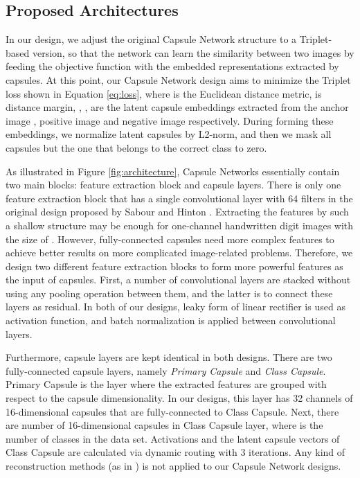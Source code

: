 \documentclass[10pt,twocolumn,letterpaper]{article}
\begin{document}
\subsection{Proposed Architectures}

In our design, we adjust the original Capsule Network structure to a Triplet-based version, so that the network can learn the similarity between two images by feeding the objective function with the embedded representations extracted by capsules. At this point, our Capsule Network design aims to minimize the Triplet loss shown in Equation \ref{eq:loss}, where  is the Euclidean distance metric,  is distance margin, , ,  are the latent capsule embeddings extracted from the anchor image , positive image  and negative image  respectively. During forming these embeddings, we normalize latent capsules by L2-norm, and then we mask all capsules but the one that belongs to the correct class to zero.



As illustrated in Figure \ref{fig:architecture}, Capsule Networks essentially contain two main blocks: feature extraction block and capsule layers. There is only one feature extraction block that has a single convolutional layer with 64 filters in the original design proposed by Sabour and Hinton \etal \cite{capsule}. Extracting the features by such a shallow structure may be enough for one-channel handwritten digit images with the size of  \cite{capsule}. However, fully-connected capsules need more complex features to achieve better results on more complicated image-related problems. Therefore, we design two different feature extraction blocks to form more powerful features as the input of capsules. First, a number of convolutional layers are stacked without using any pooling operation between them, and the latter is to connect these layers as residual. In both of our designs, leaky form of linear rectifier \cite{leaky-relu} is used as activation function, and batch normalization \cite{bn} is applied between convolutional layers.

Furthermore, capsule layers are kept identical in both designs. There are two fully-connected capsule layers, namely \textit{Primary Capsule} and \textit{Class Capsule}. Primary Capsule is the layer where the extracted features are grouped with respect to the capsule dimensionality. In our designs, this layer has 32 channels of 16-dimensional capsules that are fully-connected to Class Capsule. Next, there are  number of 16-dimensional capsules in Class Capsule layer, where  is the number of classes in the data set. Activations and the latent capsule vectors of Class Capsule are calculated via dynamic routing with 3 iterations. Any kind of reconstruction methods (\eg as in \cite{capsule}) is not applied to our Capsule Network designs.
\end{document}
